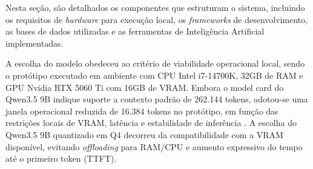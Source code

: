 \documentclass[12pt]{article}
\begin{document}




Nesta seção, são detalhados os componentes que estruturam o sistema, incluindo os requisitos de \textit{hardware} para execução local, os \textit{frameworks} de desenvolvimento, as bases de dados utilizadas e as ferramentas de Inteligência Artificial implementadas.

A escolha do modelo obedeceu ao critério de viabilidade operacional local, sendo o protótipo executado em ambiente com CPU Intel i7-14700K, 32GB de RAM e GPU Nvidia RTX 5060 Ti com 16GB de VRAM.
Embora o model card do Qwen3.5 9B indique suporte a contexto padrão de 262.144 tokens, adotou-se uma janela operacional reduzida de 16.384 tokens no protótipo, em função das restrições locais de VRAM, latência e estabilidade de inferência \cite{Qwen35ModelCard2026}.
A escolha do Qwen3.5 9B quantizado em Q4 decorreu da compatibilidade com a VRAM disponível, evitando \textit{offloading} para RAM/CPU e aumento expressivo do tempo até o primeiro token (TTFT).
\end{document}
